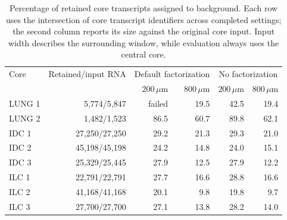 \begin{table}[ht]\centering\small
\begin{tabular}{lrrrrr}\toprule
Core&Retained/input RNA&\multicolumn{2}{c}{Default factorization}&\multicolumn{2}{c}{No factorization}\\
&&$200\,\mu\mathrm m$&$800\,\mu\mathrm m$&$200\,\mu\mathrm m$&$800\,\mu\mathrm m$\\\midrule
LUNG 1&5,774/5,847&failed&19.5&42.5&19.4\\
LUNG 2&1,482/1,523&86.5&60.7&89.8&62.1\\
IDC 1&27,250/27,250&29.2&21.3&29.3&21.0\\
IDC 2&45,198/45,198&24.2&14.8&24.0&15.1\\
IDC 3&25,329/25,445&27.9&12.5&27.9&12.2\\
ILC 1&22,791/22,791&27.7&16.6&28.8&16.6\\
ILC 2&41,168/41,168&20.1&9.8&19.8&9.7\\
ILC 3&27,700/27,700&27.1&13.8&28.2&14.0\\
\bottomrule\end{tabular}
\caption{Percentage of retained core transcripts assigned to background. Each row uses the intersection of core transcript identifiers across completed settings; the second column reports its size against the original core input. Input width describes the surrounding window, while evaluation always uses the central core.}\label{tab:context-background}
\end{table}

